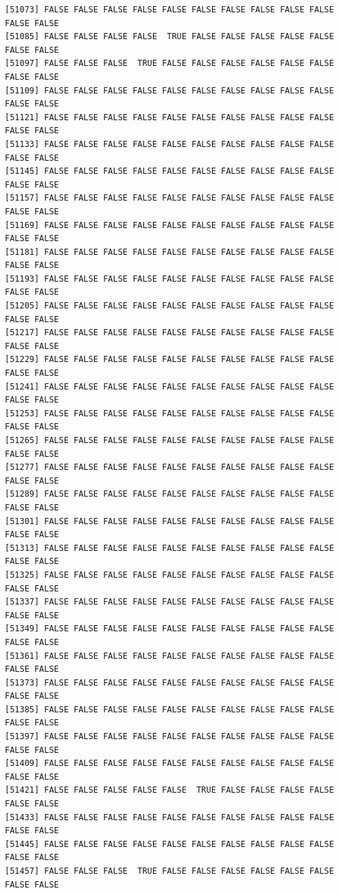 \documentclass[
  a4paper,
  DIV=11,
  numbers=noendperiod]{scrartcl}
\begin{document}
\begin{verbatim}
[51073] FALSE FALSE FALSE FALSE FALSE FALSE FALSE FALSE FALSE FALSE FALSE FALSE
[51085] FALSE FALSE FALSE FALSE  TRUE FALSE FALSE FALSE FALSE FALSE FALSE FALSE
[51097] FALSE FALSE FALSE  TRUE FALSE FALSE FALSE FALSE FALSE FALSE FALSE FALSE
[51109] FALSE FALSE FALSE FALSE FALSE FALSE FALSE FALSE FALSE FALSE FALSE FALSE
[51121] FALSE FALSE FALSE FALSE FALSE FALSE FALSE FALSE FALSE FALSE FALSE FALSE
[51133] FALSE FALSE FALSE FALSE FALSE FALSE FALSE FALSE FALSE FALSE FALSE FALSE
[51145] FALSE FALSE FALSE FALSE FALSE FALSE FALSE FALSE FALSE FALSE FALSE FALSE
[51157] FALSE FALSE FALSE FALSE FALSE FALSE FALSE FALSE FALSE FALSE FALSE FALSE
[51169] FALSE FALSE FALSE FALSE FALSE FALSE FALSE FALSE FALSE FALSE FALSE FALSE
[51181] FALSE FALSE FALSE FALSE FALSE FALSE FALSE FALSE FALSE FALSE FALSE FALSE
[51193] FALSE FALSE FALSE FALSE FALSE FALSE FALSE FALSE FALSE FALSE FALSE FALSE
[51205] FALSE FALSE FALSE FALSE FALSE FALSE FALSE FALSE FALSE FALSE FALSE FALSE
[51217] FALSE FALSE FALSE FALSE FALSE FALSE FALSE FALSE FALSE FALSE FALSE FALSE
[51229] FALSE FALSE FALSE FALSE FALSE FALSE FALSE FALSE FALSE FALSE FALSE FALSE
[51241] FALSE FALSE FALSE FALSE FALSE FALSE FALSE FALSE FALSE FALSE FALSE FALSE
[51253] FALSE FALSE FALSE FALSE FALSE FALSE FALSE FALSE FALSE FALSE FALSE FALSE
[51265] FALSE FALSE FALSE FALSE FALSE FALSE FALSE FALSE FALSE FALSE FALSE FALSE
[51277] FALSE FALSE FALSE FALSE FALSE FALSE FALSE FALSE FALSE FALSE FALSE FALSE
[51289] FALSE FALSE FALSE FALSE FALSE FALSE FALSE FALSE FALSE FALSE FALSE FALSE
[51301] FALSE FALSE FALSE FALSE FALSE FALSE FALSE FALSE FALSE FALSE FALSE FALSE
[51313] FALSE FALSE FALSE FALSE FALSE FALSE FALSE FALSE FALSE FALSE FALSE FALSE
[51325] FALSE FALSE FALSE FALSE FALSE FALSE FALSE FALSE FALSE FALSE FALSE FALSE
[51337] FALSE FALSE FALSE FALSE FALSE FALSE FALSE FALSE FALSE FALSE FALSE FALSE
[51349] FALSE FALSE FALSE FALSE FALSE FALSE FALSE FALSE FALSE FALSE FALSE FALSE
[51361] FALSE FALSE FALSE FALSE FALSE FALSE FALSE FALSE FALSE FALSE FALSE FALSE
[51373] FALSE FALSE FALSE FALSE FALSE FALSE FALSE FALSE FALSE FALSE FALSE FALSE
[51385] FALSE FALSE FALSE FALSE FALSE FALSE FALSE FALSE FALSE FALSE FALSE FALSE
[51397] FALSE FALSE FALSE FALSE FALSE FALSE FALSE FALSE FALSE FALSE FALSE FALSE
[51409] FALSE FALSE FALSE FALSE FALSE FALSE FALSE FALSE FALSE FALSE FALSE FALSE
[51421] FALSE FALSE FALSE FALSE FALSE  TRUE FALSE FALSE FALSE FALSE FALSE FALSE
[51433] FALSE FALSE FALSE FALSE FALSE FALSE FALSE FALSE FALSE FALSE FALSE FALSE
[51445] FALSE FALSE FALSE FALSE FALSE FALSE FALSE FALSE FALSE FALSE FALSE FALSE
[51457] FALSE FALSE FALSE  TRUE FALSE FALSE FALSE FALSE FALSE FALSE FALSE FALSE

\end{verbatim}
\end{document}
